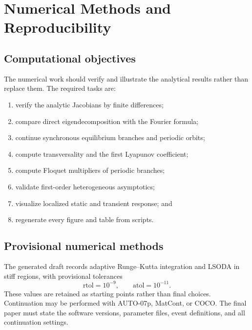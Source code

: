 \documentclass[11pt, reqno]{amsart}
\theoremstyle{definition}
\theoremstyle{remark}
\begin{document}

\section{Numerical Methods and Reproducibility}
\label{sec:numerics}

\subsection{Computational objectives}

The numerical work should verify and illustrate the analytical results rather
than replace them.  The required tasks are:
\begin{enumerate}[label=(\roman*),leftmargin=2.5em]
    \item verify the analytic Jacobians by finite differences;
    \item compare direct eigendecomposition with the Fourier formula;
    \item continue synchronous equilibrium branches and periodic orbits;
    \item compute transversality and the first Lyapunov coefficient;
    \item compute Floquet multipliers of periodic branches;
    \item validate first-order heterogeneous asymptotics;
    \item visualize localized static and transient response; and
    \item regenerate every figure and table from scripts.
\end{enumerate}

\subsection{Provisional numerical methods}

The generated draft records adaptive Runge--Kutta integration and LSODA in
stiff regions, with provisional tolerances
\[
    \mathrm{rtol}=10^{-9},
    \qquad
    \mathrm{atol}=10^{-11}.
\]
These values are retained as starting points rather than final choices.
Continuation may be performed with AUTO-07p, MatCont, or COCO.  The final paper
must state the software versions, parameter files, event definitions, and all
continuation settings.
\end{document}
